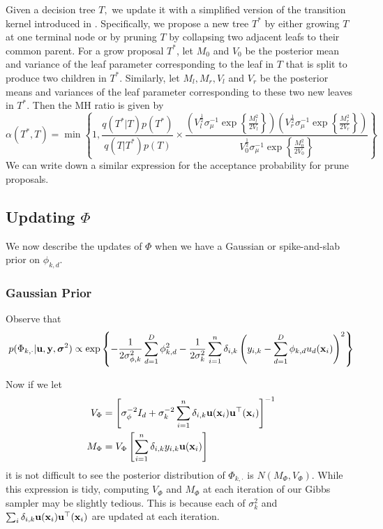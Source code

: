\documentclass[12pt]{article}
\begin{document}
Given a decision tree $T,$ we update it with a simplified version of the transition kernel introduced in \citet{Chipman1998}.
Specifically, we propose a new tree $T^{*}$ by either growing $T$ at one terminal node or by pruning $T$ by collapsing two adjacent leafs to their common parent. 
For a grow proposal $T^{*}$, let $M_{0}$ and $V_{0}$ be the posterior mean and variance of the leaf parameter corresponding to the leaf in $T$ that is split to produce two children in $T^{*}.$
Similarly, let $M_{l}, M_{r}, V_{l}$ and $V_{r}$ be the posterior means and variances of the leaf parameter corresponding to these two new leaves in $T^{*}.$
Then the MH ratio is given by
$$
\alpha(T^{*},T) = \min\left\{1, \frac{q(T^{*} | T)p(T^{*})}{q(T | T^{*})p(T)} \times \frac{\left(V_{l}^{\frac{1}{2}}\sigma_{\mu}^{-1}\exp\left\{\frac{M_{l}^{2}}{2V_{l}}\right\}\right)\left(V_{r}^{\frac{1}{2}}\sigma_{\mu}^{-1}\exp\left\{\frac{M_{r}^{2}}{2V_{r}}\right\}\right)}{V_{0}^{\frac{1}{2}}\sigma_{\mu}^{-1}\exp\left\{\frac{M^{2}_{0}}{2V_{0}}\right\}}\right\}
$$
We can write down a similar expression for the acceptance probability for prune proposals. 

\subsection{Updating $\Phi$}

We now describe the updates of $\Phi$ when we have a Gaussian or spike-and-slab prior on $\phi_{k,d}.$
\subsubsection{Gaussian Prior}

Observe that
$$
p(\Phi_{k,\cdot} | \mathbf{u}, \mathbf{y}, \boldsymbol{\sigma}^{2}) \propto \exp\left\{-\frac{1}{2\sigma^{2}_{\phi,k}}\sum_{d = 1}^{D}{\phi_{k,d}^{2}} - \frac{1}{2\sigma^{2}_{k}}\sum_{i = 1}^{n}{\delta_{i,k}\left(y_{i,k} - \sum_{d = 1}^{D}{\phi_{k,d}u_{d}(\mathbf{x}_{i})}\right)^{2}}\right\} 
$$


Now if we let 
\begin{align*}
V_{\Phi} &= \left[\sigma^{-2}_{\phi}I_{d} + \sigma^{-2}_{k}\sum_{i = 1}^{n}{\delta_{i,k}\mathbf{u}(\mathbf{x}_{i})\mathbf{u}^{\top}(\mathbf{x}_{i})}\right]^{-1} \\
M_{\Phi} &= V_{\Phi}\left[\sum_{i = 1}^{n}{\delta_{i,k}y_{i,k}\mathbf{u}(\mathbf{x}_{i})}\right]
\end{align*}
it is not difficult to see the posterior distribution of $\Phi_{k,\cdot}$ is $N(M_{\Phi}, V_{\Phi}).$
While this expression is tidy, computing $V_{\Phi}$ and $M_{\Phi}$ at each iteration of our Gibbs sampler may be slightly tedious. 
This is because each of $\sigma^{2}_{k}$ and $\sum_{i}{\delta_{i,k}\mathbf{u}(\mathbf{x}_{i})\mathbf{u}^{\top}(\mathbf{x}_{i})}$ are updated at each iteration.
\end{document}
